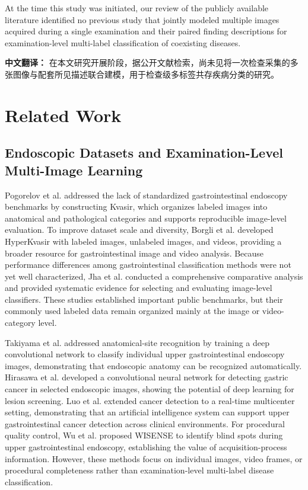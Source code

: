 \documentclass[Afour,sagev,times]{sagej}
\begin{document}
At the time this study was initiated, our review of the publicly available literature identified no previous study that jointly modeled multiple images acquired during a single examination and their paired finding descriptions for examination-level multi-label classification of coexisting diseases.

\noindent\textbf{中文翻译：} 在本文研究开展阶段，据公开文献检索，尚未见将一次检查采集的多张图像与配套所见描述联合建模，用于检查级多标签共存疾病分类的研究。

\section{Related Work}

\subsection{Endoscopic Datasets and Examination-Level Multi-Image Learning}

Pogorelov et al. addressed the lack of standardized gastrointestinal endoscopy benchmarks by constructing Kvasir, which organizes labeled images into anatomical and pathological categories and supports reproducible image-level evaluation.\cite{R1} To improve dataset scale and diversity, Borgli et al. developed HyperKvasir with labeled images, unlabeled images, and videos, providing a broader resource for gastrointestinal image and video analysis.\cite{R2} Because performance differences among gastrointestinal classification methods were not yet well characterized, Jha et al. conducted a comprehensive comparative analysis and provided systematic evidence for selecting and evaluating image-level classifiers.\cite{R3} These studies established important public benchmarks, but their commonly used labeled data remain organized mainly at the image or video-category level.

Takiyama et al. addressed anatomical-site recognition by training a deep convolutional network to classify individual upper gastrointestinal endoscopy images, demonstrating that endoscopic anatomy can be recognized automatically.\cite{R4} Hirasawa et al. developed a convolutional neural network for detecting gastric cancer in selected endoscopic images, showing the potential of deep learning for lesion screening.\cite{R5} Luo et al. extended cancer detection to a real-time multicenter setting, demonstrating that an artificial intelligence system can support upper gastrointestinal cancer detection across clinical environments.\cite{R6} For procedural quality control, Wu et al. proposed WISENSE to identify blind spots during upper gastrointestinal endoscopy, establishing the value of acquisition-process information.\cite{R7} However, these methods focus on individual images, video frames, or procedural completeness rather than examination-level multi-label disease classification.
\end{document}
